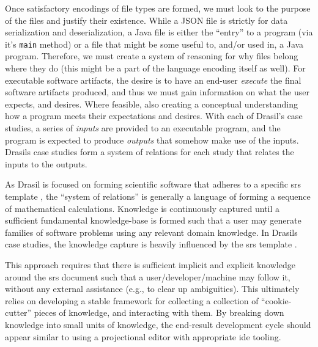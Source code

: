 Once satisfactory encodings of file types are formed, we must look to the
purpose of the files and justify their existence. While a JSON file is strictly
for data serialization and deserialization, a Java file is either the ``entry''
to a program (via it's \texttt{main} method) or a file that might be some useful
to, and/or used in, a Java program. Therefore, we must create a system of
reasoning for why files belong where they do (this might be a part of the
language encoding itself as well). For executable software artifacts, the desire
is to have an end-user \textit{execute} the final software artifacts produced,
and thus we must gain information on what the user expects, and desires. Where
feasible, also creating a conceptual understanding how a program meets their
expectations and desires. With each of Drasil's case studies, a series of
\textit{inputs} are provided to an executable program, and the program is
expected to produce \textit{outputs} that somehow make use of the inputs.
Drasils case studies form a system of relations for each study that relates the
inputs to the outputs.

As Drasil is focused on forming scientific software that adheres to a specific
\acs{srs} template \cite{SmithAndLai2005}, the ``system of relations'' is
generally a language of forming a sequence of mathematical calculations.
Knowledge is continuously captured until a sufficient fundamental knowledge-base
is formed such that a user may generate families of software problems using any
relevant domain knowledge. In Drasils case studies, the knowledge capture is
heavily influenced by the \acs{srs} template \cite{SmithAndLai2005}.

This approach requires that there is sufficient implicit and explicit knowledge
around the \acs{srs} document such that a user/developer/machine may follow it,
without any external assistance (e.g., to clear up ambiguities). This ultimately
relies on developing a stable framework for collecting a collection of
``cookie-cutter'' pieces of knowledge, and interacting with them. By breaking
down knowledge into small units of knowledge, the end-result development cycle
should appear similar to using a projectional editor with appropriate \acs{ide}
tooling.


